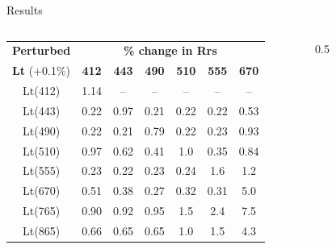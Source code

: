 \documentclass[final]{beamer}
\newlength{\sepwid}
\newlength{\onecolwid}
\newlength{\twocolwid}
\begin{document}
\begin{frame}[t]
\begin{columns}[t]
\begin{column}{\twocolwid}
\begin{block}{Results}
\begin{columns}[t,totalwidth=\twocolwid] %
\begin{column}{\onecolwid}\vspace{-.6in} 
\begin{framed}
\begin{center}
\vspace{2ex}
\begin{tabular}{|*{7}{c|}}
\toprule
\textbf{Perturbed} & \multicolumn{6}{|c|}{\textbf{\% change in Rrs}}\\
\cline{2-7}
\textbf{Lt} (+0.1\%) & \textbf{412} & \textbf{443} & \textbf{490} & \textbf{510} & \textbf{555} & \textbf{670}\\
\midrule
Lt(412) &  1.14 & -- & -- & -- & -- & --\\  
Lt(443) & 0.22 & 0.97 & 0.21 & 0.22 & 0.22 &  0.53\\
Lt(490) & 0.22 & 0.21 & 0.79 & 0.22 & 0.23 &  0.93\\
Lt(510) & 0.97 & 0.62 & 0.41 &  1.0 & 0.35 & 0.84\\
Lt(555) & 0.23 & 0.22 & 0.23 & 0.24 & 1.6 & 1.2\\
Lt(670) & 0.51 & 0.38 & 0.27 & 0.32 & 0.31 &  5.0\\
Lt(765) & 0.90 & 0.92 & 0.95 &  1.5 &  2.4 &  7.5\\
Lt(865) & 0.66 & 0.65 & 0.65 &  1.0 &  1.5 &  4.3\\
\bottomrule
\end{tabular}
\end{center}
\end{framed}
\end{column} 
\begin{column}{0.5\sepwid}\end{column} %
\begin{column}{\onecolwid}\vspace{-.6in} %


\end{column}
\end{columns}
\end{block}
\end{column}
\end{columns}
\end{frame}
\end{document}
